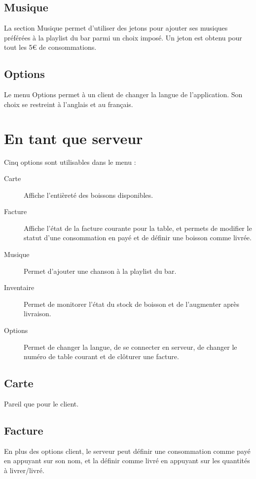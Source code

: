 ﻿\documentclass[a4paper,11pt]{article}
\begin{document}
\subsection{Musique}

La section Musique permet d'utiliser des jetons pour ajouter ses musiques préférées à la playlist du bar parmi un choix imposé. Un jeton est obtenu pour tout les 5\euro{} de consommations.

\subsection{Options}

Le menu Options permet à un client de changer la langue de l'application. Son choix se restreint à l'anglais et au français.


\pagebreak
\section{En tant que serveur}

Cinq options sont utilisables dans le menu :

\begin{description}
	\item[Carte] Affiche l'entièreté des boissons disponibles.
	\item[Facture] Affiche l'état de la facture courante pour la table, et permets de modifier le statut d'une consommation en payé et de définir une boisson comme livrée.
	\item[Musique] Permet d'ajouter une chanson à la playlist du bar.
	\item[Inventaire] Permet de monitorer l'état du stock de boisson et de l'augmenter après livraison.
	\item[Options] Permet de changer la langue, de se connecter en serveur, de changer le numéro de table courant et de clôturer une facture.
\end{description}

\subsection{Carte}	
Pareil que pour le client.
\subsection{Facture}
En plus des options client, le serveur peut définir une consommation comme payé en appuyant sur son nom, et la définir comme livré en appuyant sur les quantités à livrer/livré.
\end{document}
